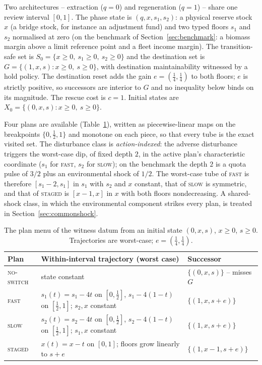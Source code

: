 \documentclass[preprint,11pt,authoryear]{elsarticle}
\theoremstyle{definition}
\theoremstyle{remark}
\newcommand{\act}[1]{\textsc{#1}}
\begin{document}
Two architectures -- extraction ($q=0$) and regeneration ($q=1$) -- share one review interval $[0,1]$. The phase state is $(q,x,s_1,s_2)$: a physical reserve stock $x$ (a bridge stock, for instance an adjustment fund) and two typed floors $s_1$ and $s_2$ normalised at zero (on the benchmark of Section~\ref{sec:benchmark}: a biomass margin above a limit reference point and a fleet income margin). The transition-safe set is $S_0=\{x\ge0,\ s_1\ge0,\ s_2\ge0\}$ and the destination set is $G=\{(1,x,s):x\ge0,\ s\ge0\}$, with destination maintainability witnessed by a hold policy. The destination reset adds the gain $e=(\tfrac14,\tfrac14)$ to both floors; $e$ is strictly positive, so successors are interior to $G$ and no inequality below binds on its magnitude. The rescue cost is $c=1$. Initial states are $X_0=\{(0,x,s):x\ge0,\ s\ge0\}$.

Four plans are available (Table~\ref{tab:actions}), written as piecewise-linear maps on the breakpoints $\{0,\tfrac12,1\}$ and monotone on each piece, so that every tube is the exact visited set. The disturbance class is \emph{action-indexed}: the adverse disturbance triggers the worst-case dip, of fixed depth $2$, in the active plan's characteristic coordinate ($s_1$ for \act{fast}, $s_2$ for \act{slow}); on the benchmark the depth $2$ is a quota pulse of $3/2$ plus an environmental shock of $1/2$. The worst-case tube of \act{fast} is therefore $[s_1-2,s_1]$ in $s_1$ with $s_2$ and $x$ constant, that of \act{slow} is symmetric, and that of \act{staged} is $[x-1,x]$ in $x$ with both floors nondecreasing. A shared-shock class, in which the environmental component strikes every plan, is treated in Section~\ref{sec:commonshock}.

\begin{table}[!htbp]
\centering\small
\caption{The plan menu of the witness datum from an initial state $(0,x,s)$, $x\ge0$, $s\ge0$. Trajectories are worst-case; $e=(\tfrac14,\tfrac14)$.}
\label{tab:actions}
\begin{tabularx}{\textwidth}{@{}lXl@{}}
\toprule
Plan & Within-interval trajectory (worst case) & Successor \\
\midrule
\act{no-switch} & state constant & $\{(0,x,s)\}$ -- misses $G$ \\
\act{fast} & $s_1(t)=s_1-4t$ on $[0,\tfrac12]$, $s_1-4(1-t)$ on $[\tfrac12,1]$; $s_2,x$ constant & $\{(1,x,s+e)\}$ \\
\act{slow} & $s_2(t)=s_2-4t$ on $[0,\tfrac12]$, $s_2-4(1-t)$ on $[\tfrac12,1]$; $s_1,x$ constant & $\{(1,x,s+e)\}$ \\
\act{staged} & $x(t)=x-t$ on $[0,1]$; floors grow linearly to $s+e$ & $\{(1,x-1,s+e)\}$ \\
\bottomrule
\end{tabularx}
\end{table}
\end{document}
